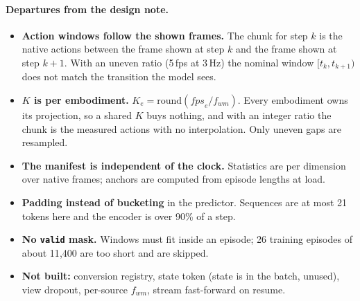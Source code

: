 \documentclass[10pt]{article}
\newcommand{\code}[1]{\texttt{\small #1}}
\begin{document}
\paragraph{Departures from the design note.}
\begin{itemize}
\item \textbf{Action windows follow the shown frames.} The chunk for step $k$ is the native
  actions between the frame shown at step $k$ and the frame shown at step $k{+}1$. With an
  uneven ratio (5\,fps at 3\,Hz) the nominal window $[t_k, t_{k+1})$ does not match the
  transition the model sees.
\item \textbf{$K$ is per embodiment.} $K_e = \mathrm{round}(\mathit{fps}_e / f_{wm})$. Every
  embodiment owns its projection, so a shared $K$ buys nothing, and with an integer ratio the
  chunk is the measured actions with no interpolation. Only uneven gaps are resampled.
\item \textbf{The manifest is independent of the clock.} Statistics are per dimension over
  native frames; anchors are computed from episode lengths at load.
\item \textbf{Padding instead of bucketing} in the predictor. Sequences are at most 21 tokens
  here and the encoder is over 90\% of a step.
\item \textbf{No \code{valid} mask.} Windows must fit inside an episode; 26 training
  episodes of about 11{,}400 are too short and are skipped.
\item \textbf{Not built:} conversion registry, state token (state is in the batch, unused),
  view dropout, per-source $f_{wm}$, stream fast-forward on resume.
\end{itemize}
\end{document}
